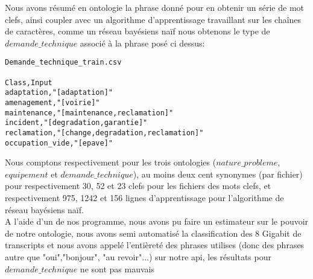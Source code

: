 Nous avons résumé en ontologie la phrase donné pour en obtenir un série de mot clefs, ainsi coupler avec un algorithme d'apprentissage travaillant sur les chaînes de caractères, comme un réseau bayésiens naïf nous obtenons le type de $demande\_technique$ associé à la phrase posé ci dessus:

\pagebreak

\begin{lstlisting}
Demande_technique_train.csv

Class,Input
adaptation,"[adaptation]"
amenagement,"[voirie]"
maintenance,"[maintenance,reclamation]"
incident,"[degradation,garantie]"
reclamation,"[change,degradation,reclamation]"
occupation_vide,"[epave]"
\end{lstlisting}

Nous comptons respectivement pour les trois ontologies ($nature\_probleme$, $equipement$ et $demande\_technique$), au moins deux cent synonymes (par fichier) pour respectivement 30, 52 et 23 clefs pour les fichiers des mots clefs, et respectivement 975, 1242 et 156 lignes d'apprentissage pour l'algorithme de réseau bayésiens naïf.\\
A l'aide d'un de nos programme, nous avons pu faire un estimateur sur le pouvoir de notre ontologie, nous avons semi automatisé la classification des 8 Gigabit de transcripts et nous avons appelé l'entièreté des phrases utilises (donc des phrases autre que "oui","bonjour", "au revoir"...) sur notre api, les résultats pour $demande\_technique$ ne sont pas mauvais

